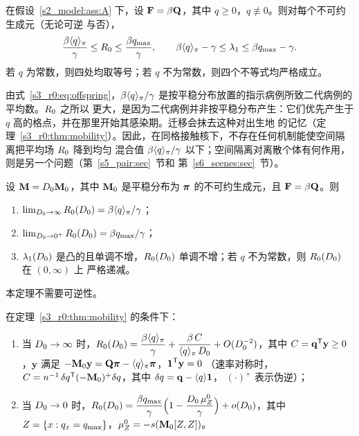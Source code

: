 \begin{theorem}\label{s3_r0:thm:bounds}
  在假设~\ref{s2_model:ass:A} 下，设 $\mathbf{F}=\beta\mathbf{Q}$，其中 $q\ge0$，$q\not\equiv0$。则对每个不可约生成元（无论可逆
  与否），
  \begin{equation}\label{s3_r0:eq:bounds}
    \frac{\beta\langle q\rangle_{\pi}}{\gamma}\le R_0\le\frac{\beta q_{\max}}{\gamma},\qquad
    \beta\langle q\rangle_{\pi}-\gamma\le\lambda_1\le\beta q_{\max}-\gamma .
  \end{equation}
  若 $q$ 为常数，则四处均取等号；若 $q$ 不为常数，则四个不等式均严格成立。
\end{theorem}

由式~\eqref{s3_r0:eq:offspring}，$\beta\langle q\rangle_{\pi}/\gamma$ 是按平稳分布放置的指示病例所致二代病例的平均数。$R_0$ 之所以
更大，是因为二代病例并非按平稳分布产生：它们优先产生于 $q$ 高的格点，并在那里开始其感染期。迁移会抹去这种对出生地
的记忆（定理~\ref{s3_r0:thm:mobility}）。因此，在同格接触核下，不存在任何机制能使空间隔离把平均场 $R_0$ 降到均匀
混合值 $\beta\langle q\rangle_{\pi}/\gamma$ 以下；空间隔离对离散个体有何作用，则是另一个问题（第~\ref{s5_pair:sec}~节和
第~\ref{s6_scenes:sec}~节）。

\begin{theorem}\label{s3_r0:thm:mobility}
  设 $\mathbf{M}=D_0\mathbf{M}_0$，其中 $\mathbf{M}_0$ 是平稳分布为 $\boldsymbol{\pi}$ 的不可约生成元，且 $\mathbf{F}=\beta\mathbf{Q}$。则
  \begin{enumerate}[label=\textup{(\alph*)},leftmargin=*]
    \item $\lim_{D_0\to\infty}R_0(D_0)=\beta\langle q\rangle_{\pi}/\gamma$；
    \item $\lim_{D_0\to0^+}R_0(D_0)=\beta q_{\max}/\gamma$；
    \item $\lambda_1(D_0)$ 是凸的且单调不增，$R_0(D_0)$ 单调不增；若 $q$ 不为常数，则 $R_0(D_0)$ 在 $(0,\infty)$ 上
      严格递减。
  \end{enumerate}
  本定理不需要可逆性。
\end{theorem}

\begin{proposition}[渐近展开]\label{s3_r0:prop:expansions}
  在定理~\ref{s3_r0:thm:mobility} 的条件下：
  \begin{enumerate}[label=\textup{(\roman*)},leftmargin=*]
    \item 当 $D_0\to\infty$ 时，$R_0(D_0)=\dfrac{\beta\langle q\rangle_{\pi}}{\gamma}+\dfrac{\beta\,C}{\langle q\rangle_{\pi}\,D_0}+O(D_0^{-2})$，其中
      $C=\mathbf{q}^{\mathsf{T}}\mathbf{y}\ge0$，$\mathbf{y}$ 满足 $-\mathbf{M}_0\mathbf{y}=\mathbf{Q}\boldsymbol{\pi}-\langle q\rangle_{\pi}\boldsymbol{\pi}$，$\boldsymbol{1}^{\mathsf{T}}\mathbf{y}=0$
      （速率对称时，$C=n^{-1}\,\delta q^{\mathsf{T}}(-\mathbf{M}_0)^{+}\delta q$，其中 $\delta q=\mathbf{q}-\langle q\rangle\boldsymbol{1}$，
      $(\cdot)^{+}$ 表示伪逆）；
    \item 当 $D_0\to0$ 时，$R_0(D_0)=\dfrac{\beta q_{\max}}{\gamma}\Bigl(1-\dfrac{D_0\,\mu^0_Z}{\gamma}\Bigr)+o(D_0)$，其中
      $Z=\{x:q_x=q_{\max}\}$，$\mu^0_Z=-s(\mathbf{M}_0[Z,Z])$。
  \end{enumerate}
\end{proposition}

